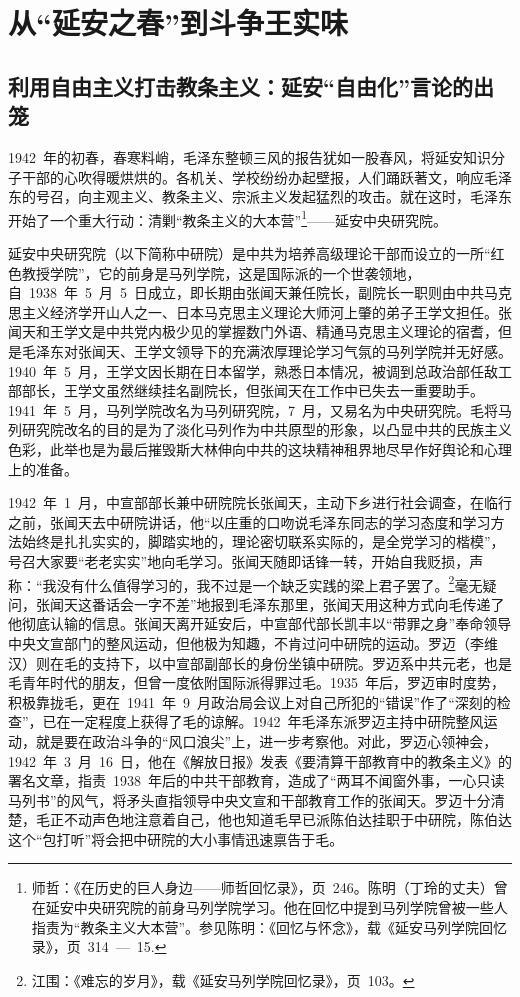 
\chapter{从“延安之春”到斗争王实味}

\section{利用自由主义打击教条主义：延安“自由化”言论的出笼}

1942~年的初春，春寒料峭，毛泽东整顿三风的报告犹如一股春风，将延安知识分子干部的心吹得暖烘烘的。各机关、学校纷纷办起壁报，人们踊跃著文，响应毛泽东的号召，向主观主义、教条主义、宗派主义发起猛烈的攻击。就在这时，毛泽东开始了一个重大行动：清剿“教条主义的大本营”\footnote{师哲：《在历史的巨人身边——师哲回忆录》，页~246。陈明（丁玲的丈夫）曾在延安中央研究院的前身马列学院学习。他在回忆中提到马列学院曾被一些人指责为“教条主义大本营”。参见陈明：《回忆与怀念》，载《延安马列学院回忆录》，页~314~—~15.}——延安中央研究院。

延安中央研究院（以下简称中研院）是中共为培养高级理论干部而设立的一所“红色教授学院”，它的前身是马列学院，这是国际派的一个世袭领地，自~1938~年~5~月~5~日成立，即长期由张闻天兼任院长，副院长一职则由中共马克思主义经济学开山人之一、日本马克思主义理论大师河上肇的弟子王学文担任。张闻天和王学文是中共党内极少见的掌握数门外语、精通马克思主义理论的宿耆，但是毛泽东对张闻天、王学文领导下的充满浓厚理论学习气氛的马列学院并无好感。1940~年~5~月，王学文因长期在日本留学，熟悉日本情况，被调到总政治部任敌工部部长，王学文虽然继续挂名副院长，但张闻天在工作中已失去一重要助手。1941~年~5~月，马列学院改名为马列研究院，7~月，又易名为中央研究院。毛将马列研究院改名的目的是为了淡化马列作为中共原型的形象，以凸显中共的民族主义色彩，此举也是为最后摧毁斯大林伸向中共的这块精神租界地尽早作好舆论和心理上的准备。

1942~年~1~月，中宣部部长兼中研院院长张闻天，主动下乡进行社会调查，在临行之前，张闻天去中研院讲话，他“以庄重的口吻说毛泽东同志的学习态度和学习方法始终是扎扎实实的，脚踏实地的，理论密切联系实际的，是全党学习的楷模”，号召大家要“老老实实”地向毛学习。张闻天随即话锋一转，开始自我贬损，声称：“我没有什么值得学习的，我不过是一个缺乏实践的梁上君子罢了。\footnote{江围：《难忘的岁月》，载《延安马列学院回忆录》，页~103。}毫无疑问，张闻天这番话会一字不差”地报到毛泽东那里，张闻天用这种方式向毛传递了他彻底认输的信息。张闻天离开延安后，中宣部代部长凯丰以“带罪之身”奉命领导中央文宣部门的整风运动，但他极为知趣，不肯过问中研院的运动。罗迈（李维汉）则在毛的支持下，以中宣部副部长的身份坐镇中研院。罗迈系中共元老，也是毛青年时代的朋友，但曾一度依附国际派得罪过毛。1935~年后，罗迈审时度势，积极靠拢毛，更在~1941~年~9~月政治局会议上对自己所犯的“错误”作了“深刻的检查”，已在一定程度上获得了毛的谅解。1942~年毛泽东派罗迈主持中研院整风运动，就是要在政治斗争的“风口浪尖”上，进一步考察他。对此，罗迈心领神会，1942~年~3~月~16~日，他在《解放日报》发表《要清算干部教育中的教条主义》的署名文章，指责~1938~年后的中共干部教育，造成了“两耳不闻窗外事，一心只读马列书”的风气，将矛头直指领导中央文宣和干部教育工作的张闻天。罗迈十分清楚，毛正不动声色地注意着自己，他也知道毛早已派陈伯达挂职于中研院，陈伯达这个“包打听”将会把中研院的大小事情迅速禀告于毛。

